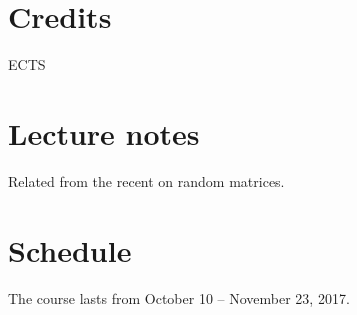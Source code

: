 \documentclass[letterpaper,10pt,english]{sphinxhowto}
\begin{document}
\section{Credits}
\label{\detokenize{teaching/random_matrices_2017:credits}}
 ECTS


\section{Lecture notes}
\label{\detokenize{teaching/random_matrices_2017:lecture-notes}}
\sphinxAtStartPar
Related  from the recent  on random matrices.


\section{Schedule}
\label{\detokenize{teaching/random_matrices_2017:schedule}}
\sphinxAtStartPar
The course lasts from October 10 – November 23, 2017.
\end{document}
